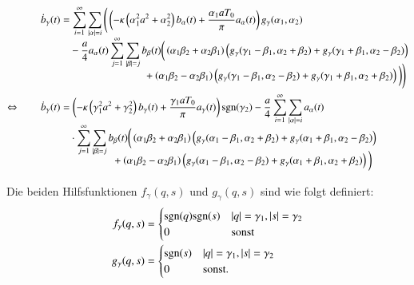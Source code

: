 \begin{align}
\dot{b}_\gamma(t)
&=
\sum_{i = 1}^{\infty}
\sum_{|\alpha| = i}
\Bigg(
\left(
-
\kappa
\left(\alpha_1^2 a^2 + \alpha_2^2\right)
b_{\alpha}(t)
+
\frac{\alpha_1 a T_0}{\pi}
a_{\alpha}(t)
\right)
g_\gamma(\alpha_1, \alpha_2) 
\nonumber
\\[-1ex]
&\phantom{={}}
-
\frac{a}{4}
a_{\alpha}(t)
\sum_{j = 1}^{\infty}
\sum_{|\beta| = j}
b_{\beta}(t)
\bigg(
\left(\alpha_1 \beta_2 + \alpha_2 \beta_1 \right)
\left(
g_\gamma(\gamma_1 - \beta_1, \alpha_2 + \beta_2)
+
g_\gamma(\gamma_1 + \beta_1, \alpha_2 - \beta_2)
\right) \nonumber
\\[-2ex]
&\phantom{=-aat\sum\sum...{}ccc}
+
\left(\alpha_1 \beta_2 - \alpha_2 \beta_1 \right)
\left(
g_\gamma(\gamma_1 - \beta_1, \alpha_2 - \beta_2)
+
g_\gamma(\gamma_1 + \beta_1, \alpha_2 + \beta_2)
\right)
\bigg)
\Bigg) \nonumber
\\
\Leftrightarrow \qquad
\dot{b}_\gamma(t)
&=
\left(
-
\kappa
\left(\gamma_1^2 a^2 + \gamma_2^2\right)
b_{\gamma}(t)
+
\frac{\gamma_1 a T_0}{\pi}
a_{\gamma}(t)
\right)
\sgn(\gamma_2)
-
\frac{a}{4}
\sum_{i = 1}^{\infty}
\sum_{|\alpha| = i}
a_{\alpha}(t)
\nonumber
\\[-1ex]
&\phantom{={}}
\cdot
\sum_{j = 1}^{\infty}
\sum_{|\beta| = j}
b_{\beta}(t)
\bigg(
\left(\alpha_1 \beta_2 + \alpha_2 \beta_1 \right)
\left(
g_\gamma(\alpha_1 - \beta_1, \alpha_2 + \beta_2)
+
g_\gamma(\alpha_1 + \beta_1, \alpha_2 - \beta_2)
\right)
\nonumber
\\[-2ex]
&\phantom{=-aat\sum..}
+
\left(\alpha_1 \beta_2 - \alpha_2 \beta_1 \right)
\left(
g_\gamma(\alpha_1 - \beta_1, \alpha_2 - \beta_2)
+
g_\gamma(\alpha_1 + \beta_1, \alpha_2 + \beta_2)
\right)
\bigg)
\label{equation:lorenz2:dotb}
\end{align}

Die beiden Hilfsfunktionen $f_\gamma(q, s)$ und $g_\gamma(q, s)$ sind wie folgt 
definiert:
\begin{align*}
f_\gamma(q, s)
&=
\begin{cases}
\sgn(q)\sgn(s) & |q| = \gamma_1, |s| = \gamma_2 \\
0 & \text{sonst}
\end{cases}
\\
g_\gamma(q, s)
&=
\begin{cases}
\sgn(s) & |q| = \gamma_1, |s| = \gamma_2 \\
0 & \text{sonst}.
\end{cases}
\end{align*}
